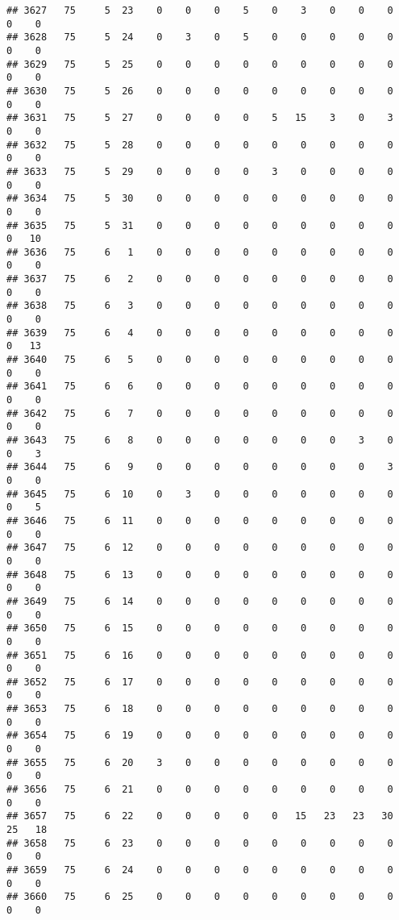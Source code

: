 \documentclass[]{article}
\begin{document}
\begin{verbatim}
## 3627   75     5  23    0    0    0    5    0    3    0    0    0    0    0
## 3628   75     5  24    0    3    0    5    0    0    0    0    0    0    0
## 3629   75     5  25    0    0    0    0    0    0    0    0    0    0    0
## 3630   75     5  26    0    0    0    0    0    0    0    0    0    0    0
## 3631   75     5  27    0    0    0    0    5   15    3    0    3    0    0
## 3632   75     5  28    0    0    0    0    0    0    0    0    0    0    0
## 3633   75     5  29    0    0    0    0    3    0    0    0    0    0    0
## 3634   75     5  30    0    0    0    0    0    0    0    0    0    0    0
## 3635   75     5  31    0    0    0    0    0    0    0    0    0    0   10
## 3636   75     6   1    0    0    0    0    0    0    0    0    0    0    0
## 3637   75     6   2    0    0    0    0    0    0    0    0    0    0    0
## 3638   75     6   3    0    0    0    0    0    0    0    0    0    0    0
## 3639   75     6   4    0    0    0    0    0    0    0    0    0    0   13
## 3640   75     6   5    0    0    0    0    0    0    0    0    0    0    0
## 3641   75     6   6    0    0    0    0    0    0    0    0    0    0    0
## 3642   75     6   7    0    0    0    0    0    0    0    0    0    0    0
## 3643   75     6   8    0    0    0    0    0    0    0    3    0    0    3
## 3644   75     6   9    0    0    0    0    0    0    0    0    3    0    0
## 3645   75     6  10    0    3    0    0    0    0    0    0    0    0    5
## 3646   75     6  11    0    0    0    0    0    0    0    0    0    0    0
## 3647   75     6  12    0    0    0    0    0    0    0    0    0    0    0
## 3648   75     6  13    0    0    0    0    0    0    0    0    0    0    0
## 3649   75     6  14    0    0    0    0    0    0    0    0    0    0    0
## 3650   75     6  15    0    0    0    0    0    0    0    0    0    0    0
## 3651   75     6  16    0    0    0    0    0    0    0    0    0    0    0
## 3652   75     6  17    0    0    0    0    0    0    0    0    0    0    0
## 3653   75     6  18    0    0    0    0    0    0    0    0    0    0    0
## 3654   75     6  19    0    0    0    0    0    0    0    0    0    0    0
## 3655   75     6  20    3    0    0    0    0    0    0    0    0    0    0
## 3656   75     6  21    0    0    0    0    0    0    0    0    0    0    0
## 3657   75     6  22    0    0    0    0    0   15   23   23   30   25   18
## 3658   75     6  23    0    0    0    0    0    0    0    0    0    0    0
## 3659   75     6  24    0    0    0    0    0    0    0    0    0    0    0
## 3660   75     6  25    0    0    0    0    0    0    0    0    0    0    0

\end{verbatim}
\end{document}
